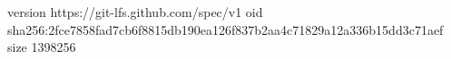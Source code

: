 version https://git-lfs.github.com/spec/v1
oid sha256:2fce7858fad7cb6f8815db190ea126f837b2aa4c71829a12a336b15dd3c71aef
size 1398256
